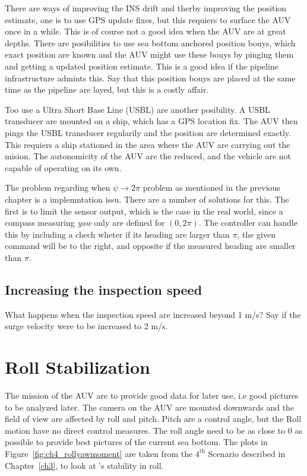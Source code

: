 	There are ways of improving the INS drift and therby improving the position estimate, one is to use 
	GPS update fixes, but this requiers to
	surface the AUV once in a while. This is of course not a good idea when the AUV are at great depths.
	There are posibilities to use sea bottom anchored position bouys, which exact position are known and
	the AUV might use these bouys by pinging them and getting a updated position estimate. This is a good
	idea if the pipeline infrastructure admints this. Say that this position bouys are placed at the same
	time as the pipeline are layed, but this is a costly affair. 

	Too use a Ultra Short Base Line (USBL) are another posibility. A USBL transducer are mounted on a
	ship, which has a GPS location fix. The AUV then pings the USBL transducer regularily and the position
	are determined exactly. This requiers a ship stationed in the area where the AUV are carrying out the
	mision. The autonomicity of the AUV are the reduced, and the vehicle are not capable of operating on
	its own. 

	The problem regarding when $\psi \rightarrow 2\pi$ problem as mentioned in the previous chapter is a
	implemntation issu. There are a number of solutions for this.
	The first is to limit the sensor output, which is the case in the real world, since a compass
	measuring \textit{yaw} only are defined for $(0, 2 \pi)$. The controller can handle this by including
	a chech wheter if its heading are larger than $\pi$, the given command will be to the right, and
	opposite if the measured heading are smaller than $\pi$.

	\subsection{Increasing the inspection speed}
		What happens when the inspection speed are increased beyond 1 m/s? Say if the surge velocity
		were to be increased to 2 m/s. 




\section{Roll Stabilization}
	The mission of the AUV are to provide good data for later use, i.e good pictures to be analyzed later.
	The camera on the AUV are mounted downwards and the field of view are affected by roll and pitch.
	Pitch are a control angle, but the Roll motion have no direct control measures. The roll angle need to
	be as close to 0 as possible to provide best pictures of the current sea bottom.
	The plots in Figure~\ref{fig:ch4_rollyawmoment}
	are taken from the $4^{\mathrm{th}}$ Scenario described in Chapter~\ref{ch3}, to look at \hugin's 
	stability in roll.

